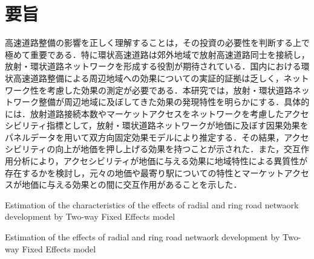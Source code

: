 \chapter*{要旨}
高速道路整備の影響を正しく理解することは，その投資の必要性を判断する上で極めて重要である．特に環状高速道路は郊外地域で放射高速道路同士を接続し，放射・環状道路ネットワークを形成する役割が期待されている．国内における環状高速道路整備による周辺地域への効果についての実証的証拠は乏しく，ネットワーク性を考慮した効果の測定が必要である．本研究では，放射・環状道路ネットワーク整備が周辺地域に及ぼしてきた効果の発現特性を明らかにする．具体的には．放射道路接続本数やマーケットアクセスをネットワークを考慮したアクセシビリティ指標として，放射・環状道路ネットワークが地価に及ぼす因果効果をパネルデータを用いて双方向固定効果モデルにより推定する．その結果，アクセシビリティの向上が地価を押し上げる効果を持つことが示された．また，交互作用分析により，アクセシビリティが地価に与える効果に地域特性による異質性が存在するかを検討し，元々の地価や最寄り駅についての特性とマーケットアクセスが地価に与える効果との間に交互作用があることを示した．




Estimation of the characteristics of the effects of radial and ring road netwaork development by Two-way Fixed Effects model 

Estimation of the effects of radial and ring road netwaork development by Two-way Fixed Effects model 